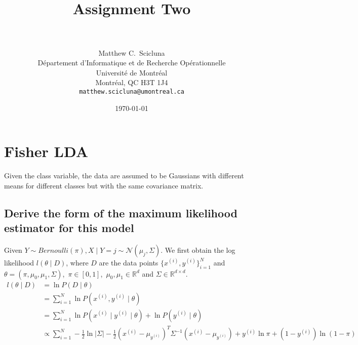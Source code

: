 \documentclass[paper=a4, fontsize=11pt]{scrartcl} %
\title{	
\normalfont \normalsize 
\horrule{0.5pt} \\[0.4cm] %
\huge Assignment Two \\ %
\horrule{2pt} \\[0.5cm] %
}
\author{
	Matthew C.~Scicluna\\
	D\'epartement d'Informatique et de Recherche Op\'erationnelle\\
	Universit\'e de Montr\'eal\\
	Montr\'eal, QC H3T 1J4 \\
	\texttt{matthew.scicluna@umontreal.ca}
}
\date{\normalsize\today} %
\numberwithin{equation}{section} %
\numberwithin{figure}{section} %
\numberwithin{table}{section} %
\begin{document}
\maketitle %

\section{Fisher LDA}
Given the class variable, the data are assumed to be Gaussians with different means for different classes but with the same covariance matrix.

\subsection{Derive the form of the maximum likelihood estimator for this model}
	Given \(Y \sim Bernoulli(\pi), X \mid Y = j \sim \mathcal{N}(\mu_j, \Sigma) \). We first obtain the log likelihood \(l(\theta \mid D)\), where \(D\) are the data points \(\{x^{(i)}, y^{(i)}\}_{i=1}^N\) and \(\theta = (\pi, \mu_0,\mu_1, \Sigma)\),\ \(\pi \in [0,1]\),\ \(\mu_0,\mu_1 \in \mathbb{R}^d \) and \(\Sigma \in \mathbb{R}^{d \times d} \).
	\begin{align*}
	l(\theta \mid D) &= \ln P(D \mid \theta) \\
	&= \sum_{i=1}^{N} \ln P(x^{(i)}, y^{(i)} \mid \theta) \\ 
	&= \sum_{i=1}^{N} \ln P(x^{(i)} \mid y^{(i)} \mid \theta) + \ln P(y^{(i)} \mid \theta)\\
	&\propto \sum_{i=1}^{N} -\frac{1}{2}\ln |\Sigma| -\frac{1}{2}(x^{(i)}-\mu_{y^{(i)}})^T\Sigma^{-1}(x^{(i)}-\mu_{y^{(i)}}) + y^{(i)}\ln \pi + (1-y^{(i)})\ln(1-\pi) 
	\end{align*}
	
\end{document}

